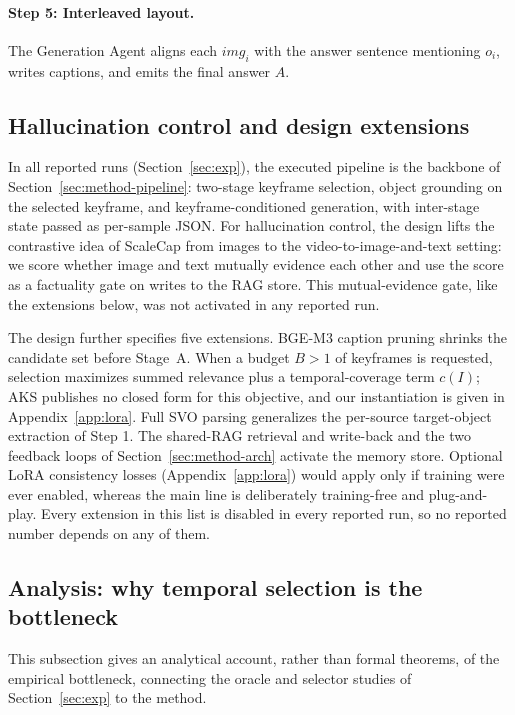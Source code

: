 \paragraph{Step 5: Interleaved layout.} The Generation Agent aligns each $img_i$ with the answer sentence mentioning $o_i$, writes captions, and emits the final answer $A$.

\subsection{Hallucination control and design extensions}\label{sec:method-halluc}

In all reported runs (Section~\ref{sec:exp}), the executed pipeline is the backbone of Section~\ref{sec:method-pipeline}: two-stage keyframe selection, object grounding on the selected keyframe, and keyframe-conditioned generation, with inter-stage state passed as per-sample JSON. For hallucination control, the design lifts the contrastive idea of ScaleCap \citep{scalecap2506} from images to the video-to-image-and-text setting: we score whether image and text mutually evidence each other and use the score as a factuality gate on writes to the RAG store. This mutual-evidence gate, like the extensions below, was not activated in any reported run.

The design further specifies five extensions. BGE-M3 caption pruning \citep{videoespresso2411} shrinks the candidate set before Stage~A. When a budget $B > 1$ of keyframes is requested, selection maximizes summed relevance plus a temporal-coverage term $c(I)$; AKS \citep{aks2502} publishes no closed form for this objective, and our instantiation is given in Appendix~\ref{app:lora}. Full SVO parsing generalizes the per-source target-object extraction of Step 1. The shared-RAG retrieval and write-back and the two feedback loops of Section~\ref{sec:method-arch} activate the memory store. Optional LoRA consistency losses (Appendix~\ref{app:lora}) would apply only if training were ever enabled, whereas the main line is deliberately training-free and plug-and-play. Every extension in this list is disabled in every reported run, so no reported number depends on any of them.

\subsection{Analysis: why temporal selection is the bottleneck}\label{sec:method-analysis}

This subsection gives an analytical account, rather than formal theorems, of the empirical bottleneck, connecting the oracle and selector studies of Section~\ref{sec:exp} to the method.

